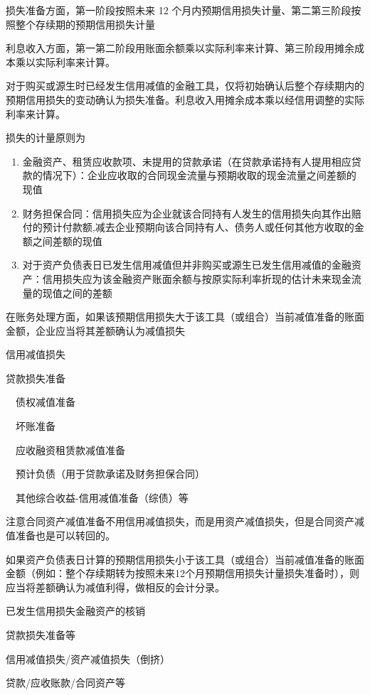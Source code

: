 \documentclass[UTF8,12pt]{ctexart}
\newenvironment{Dr}{%
	\begin{list}{}%
		{
			\setlength{\leftmargin}{2em}
			\setlength{\labelwidth}{2em}
			\setlength{\labelsep}{0pt}
			\setlength{\itemindent}{0pt}
			\setlength{\listparindent}{0pt}
			\setlength{\parsep}{0pt}
			\setlength{\topsep}{0pt}
		}
		\item[\textbf{借：}]
	}{%
	\end{list}
}
\newenvironment{Cr}{%
	\begin{list}{}%
		{
			\setlength{\leftmargin}{2em}
			\setlength{\labelwidth}{2em}
			\setlength{\labelsep}{0pt}
			\setlength{\itemindent}{0pt}
			\setlength{\listparindent}{0pt}
			\setlength{\parsep}{0pt}
			\setlength{\topsep}{0pt}
		}
		\item[\textbf{贷：}]
	}{%
	\end{list}
}
\numberwithin{equation}{section} %
\numberwithin{figure}{section}
\numberwithin{table}{section}
\begin{document}
	损失准备方面，第一阶段按照未来 12 个月内预期信用损失计量、第二第三阶段按照整个存续期的预期信用损失计量
	
	利息收入方面，第一第二阶段用账面余额乘以实际利率来计算、第三阶段用摊余成本乘以实际利率来计算。
	
	对于购买或源生时已经发生信用减值的金融工具，仅将初始确认后整个存续期内的预期信用损失的变动确认为损失准备。利息收入用摊余成本乘以经信用调整的实际利率来计算。
	
	损失的计量原则为
	\begin{enumerate}
		\item 金融资产、租赁应收款项、未提用的贷款承诺（在贷款承诺持有人提用相应贷款的情况下）：企业应收取的合同现金流量与预期收取的现金流量之间差额的现值
		
		\item 财务担保合同：信用损失应为企业就该合同持有人发生的信用损失向其作出赔付的预计付款额,减去企业预期向该合同持有人、债务人或任何其他方收取的金额之间差额的现值
		
		\item 对于资产负债表日已发生信用减值但并非购买或源生已发生信用减值的金融资产：信用损失应为该金融资产账面余额与按原实际利率折现的估计未来现金流量的现值之间的差额
		
	\end{enumerate}

	在账务处理方面，如果该预期信用损失大于该工具（或组合）当前减值准备的账面金额，企业应当将其差额确认为减值损失
	
	\begin{Dr}
		信用减值损失
	\end{Dr}
	\begin{Cr}
		贷款损失准备
		
		\ \ 债权减值准备
		
		\ \ 坏账准备
		
		\ \ 应收融资租赁款减值准备
		
		\ \ 预计负债（用于贷款承诺及财务担保合同）
		
		\ \ 其他综合收益-信用减值准备（综债）等
	\end{Cr}

	注意合同资产减值准备不用信用减值损失，而是用资产减值损失，但是合同资产减值准备也是可以转回的。
	
	如果资产负债表日计算的预期信用损失小于该工具（或组合）当前减值准备的账面金额（例如：整个存续期转为按照未来12个月预期信用损失计量损失准备时），则应当将差额确认为减值利得，做相反的会计分录。
	
	已发生信用损失金融资产的核销
	\begin{Dr}
		贷款损失准备等
		
		信用减值损失/资产减值损失（倒挤）
	\end{Dr}
	\begin{Cr}
		贷款/应收账款/合同资产等
	\end{Cr}
	
\end{document}
